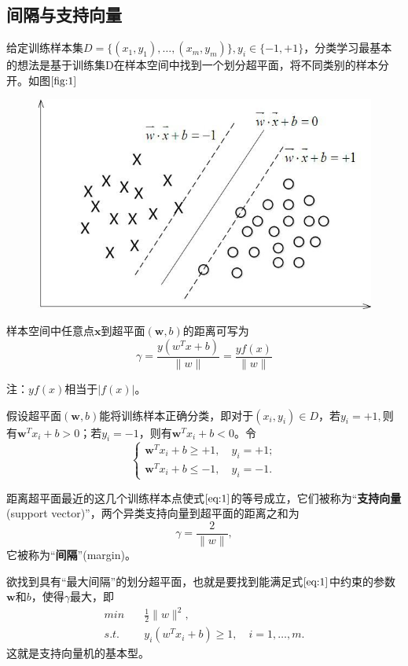 \subsection*{间隔与支持向量}
给定训练样本集$D=\{(x_1,y_1),\dots,(x_m,y_m)\},y_i\in \{-1,+1\}$，分类学习最基本的想法是基于训练集D在样本空间中找到一个划分超平面，将不同类别的样本分开。如图$\ref{fig:1}$
\begin{figure}
	\centering
	\includegraphics[width=0.7\linewidth]{chapter/统计机器学习/支持向量机/1}
	\caption{}
	\label{fig:1}
\end{figure}

样本空间中任意点$\boldsymbol{x}$到超平面$(\boldsymbol{w},b)$的距离可写为
$$\gamma = \frac{y(w^T x + b)}{\lVert w\rVert} = \frac{yf(x)}{\lVert w \rVert}$$

注：$yf(x)$相当于$\lvert f(x) \rvert$。

假设超平面$(\boldsymbol{w},b)$能将训练样本正确分类，即对于$(x_i,y_i)\in D$，若$y_i=+1,$则有$\boldsymbol{w}^Tx_i+b>0$；若$y_i=-1$，则有$\boldsymbol{w}^Tx_i+b<0$。令
\begin{equation}
\label{eq:1}
\begin{cases} 
\boldsymbol{w}^Tx_i+b\geq +1,\quad y_i=+1;\\
\boldsymbol{w}^Tx_i+b\leq -1,\quad y_i=-1.
\end{cases}
\end{equation}

距离超平面最近的这几个训练样本点使式$\ref{eq:1}$的等号成立，它们被称为“\textbf{支持向量}(support vector)”，两个异类支持向量到超平面的距离之和为
\begin{equation}
\label{eq:2}
\gamma = \frac{2}{\lVert w \rVert},
\end{equation}
它被称为“\textbf{间隔}”(margin)。

欲找到具有“最大间隔”的划分超平面，也就是要找到能满足式$\ref{eq:1}$中约束的参数$\boldsymbol{w}$和$b$，使得$\gamma$最大，即
\begin{equation}
\label{eq:3}
\begin{aligned}
min \quad &\frac{1}{2}\lVert w \rVert^2, \\
s.t. \quad & y_i (w^Tx _i + b) \geq 1, \quad i = 1,\dots, m.
\end{aligned}
\end{equation}
这就是支持向量机的基本型。


